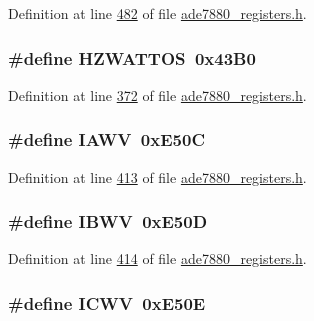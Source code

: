 Definition at line \hyperlink{a00036_source_l00482}{482} of file \hyperlink{a00036_source}{ade7880\-\_\-registers.\-h}.

\hypertarget{a00036_a1a18f83dbc089696501ce563808b95e3}{
\subsubsection[{H\-Z\-W\-A\-T\-T\-O\-S}]{\setlength{\rightskip}{0pt plus 5cm}\#define H\-Z\-W\-A\-T\-T\-O\-S~0x43\-B0}}\label{de/d8c/a00036_a1a18f83dbc089696501ce563808b95e3}


Definition at line \hyperlink{a00036_source_l00372}{372} of file \hyperlink{a00036_source}{ade7880\-\_\-registers.\-h}.

\hypertarget{a00036_a525259e0ba4c1cfa00935ee908bd8925}{
\subsubsection[{I\-A\-W\-V}]{\setlength{\rightskip}{0pt plus 5cm}\#define I\-A\-W\-V~0x\-E50\-C}}\label{de/d8c/a00036_a525259e0ba4c1cfa00935ee908bd8925}


Definition at line \hyperlink{a00036_source_l00413}{413} of file \hyperlink{a00036_source}{ade7880\-\_\-registers.\-h}.

\hypertarget{a00036_af68641d9d0f3ee5d4ab9b220ecac7e08}{
\subsubsection[{I\-B\-W\-V}]{\setlength{\rightskip}{0pt plus 5cm}\#define I\-B\-W\-V~0x\-E50\-D}}\label{de/d8c/a00036_af68641d9d0f3ee5d4ab9b220ecac7e08}


Definition at line \hyperlink{a00036_source_l00414}{414} of file \hyperlink{a00036_source}{ade7880\-\_\-registers.\-h}.

\hypertarget{a00036_aada6da221fdbd1a9756b11959e2dd13f}{
\subsubsection[{I\-C\-W\-V}]{\setlength{\rightskip}{0pt plus 5cm}\#define I\-C\-W\-V~0x\-E50\-E}}\label{de/d8c/a00036_aada6da221fdbd1a9756b11959e2dd13f}



